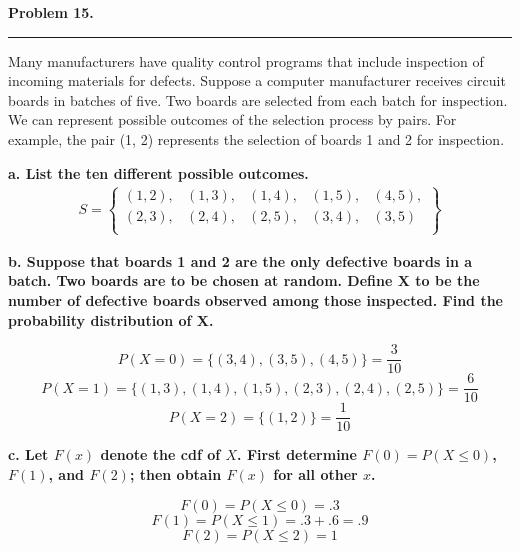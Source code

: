 \textbf{Problem 15.} \\
\hrule 

Many manufacturers have quality control programs that include inspection of incoming materials for defects. Suppose a computer manufacturer receives circuit boards in batches of five. Two boards are selected from each batch for inspection. We can represent possible outcomes of the selection process by pairs. For example, the pair (1, 2) represents the selection of boards 1 and 2 for inspection.

\textbf{a. List the ten different possible outcomes.}
\begin{align*}
    S = \left\{ \begin{array}{ccccc}
    (1,2), & (1,3), & (1,4), & (1,5), & (4,5), \\
    (2,3), & (2,4), & (2,5), & (3,4), & (3,5) \\
    \end{array} \right\}
\end{align*}

\textbf{b. Suppose that boards 1 and 2 are the only defective boards in a batch. Two boards are to be chosen at random. Define X to be the number of defective boards observed among those inspected. Find the probability distribution of X.}

\[P(X = 0) = \{(3,4), (3,5), (4,5)\} = \frac{3}{10} \]
\[P(X = 1) = \{(1,3), (1,4), (1,5), (2,3), (2,4), (2,5)\} = \frac{6}{10}\]
\[P(X = 2) = \{(1,2)\} = \frac{1}{10}\]

\textbf{c. Let $F(x)$ denote the cdf of $X$. First determine $F(0) = P(X \leq 0)$, $F(1)$, and $F(2)$; then obtain $F(x)$ for all other $x$.}

\[F(0) = P(X \leq 0) = \boxed{.3}\]
\[F(1) = P(X \leq 1) = .3 + .6 = \boxed{.9}\]
\[F(2) = P(X \leq 2) = \boxed{1}\]